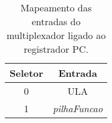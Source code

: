 
\begin{table}[]
\centering
\begin{tabular}{|c|c|}
\hline
\textbf{Seletor} & \textbf{Entrada}     \\ \hline
0       & ULA         \\ \hline
1       & \textit{pilhaFuncao} \\ \hline
\end{tabular}
\caption{Mapeamento das entradas do multiplexador ligado ao registrador PC.}
\label{table_muxPc}
\end{table}